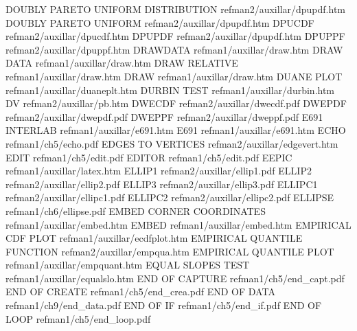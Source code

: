DOUBLY PARETO UNIFORM DISTRIBUTION      refman2/auxillar/dpupdf.htm
DOUBLY PARETO UNIFORM                   refman2/auxillar/dpupdf.htm
DPUCDF                                  refman2/auxillar/dpucdf.htm
DPUPDF                                  refman2/auxillar/dpupdf.htm
DPUPPF                                  refman2/auxillar/dpuppf.htm
DRAWDATA                                refman1/auxillar/draw.htm
DRAW DATA                               refman1/auxillar/draw.htm
DRAW RELATIVE                           refman1/auxillar/draw.htm
DRAW                                    refman1/auxillar/draw.htm
DUANE PLOT                              refman1/auxillar/duaneplt.htm
DURBIN TEST                             refman1/auxillar/durbin.htm
DV                                      refman2/auxillar/pb.htm
DWECDF                                  refman2/auxillar/dwecdf.pdf
DWEPDF                                  refman2/auxillar/dwepdf.pdf
DWEPPF                                  refman2/auxillar/dweppf.pdf
E691 INTERLAB                           refman1/auxillar/e691.htm
E691                                    refman1/auxillar/e691.htm
ECHO                                    refman1/ch5/echo.pdf
EDGES TO VERTICES                       refman2/auxillar/edgevert.htm
EDIT                                    refman1/ch5/edit.pdf
EDITOR                                  refman1/ch5/edit.pdf
EEPIC                                   refman1/auxillar/latex.htm
ELLIP1                                  refman2/auxillar/ellip1.pdf
ELLIP2                                  refman2/auxillar/ellip2.pdf
ELLIP3                                  refman2/auxillar/ellip3.pdf
ELLIPC1                                 refman2/auxillar/ellipc1.pdf
ELLIPC2                                 refman2/auxillar/ellipc2.pdf
ELLIPSE                                 refman1/ch6/ellipse.pdf
EMBED CORNER COORDINATES                refman1/auxillar/embed.htm
EMBED                                   refman1/auxillar/embed.htm
EMPIRICAL CDF PLOT                      refman1/auxillar/ecdfplot.htm
EMPIRICAL QUANTILE FUNCTION             refman2/auxillar/empqua.htm
EMPIRICAL QUANTILE PLOT                 refman1/auxillar/empquant.htm
EQUAL SLOPES TEST                       refman1/auxillar/equalslo.htm
END OF CAPTURE                          refman1/ch5/end_capt.pdf
END OF CREATE                           refman1/ch5/end_crea.pdf
END OF DATA                             refman1/ch9/end_data.pdf
END OF IF                               refman1/ch5/end_if.pdf
END OF LOOP                             refman1/ch5/end_loop.pdf
